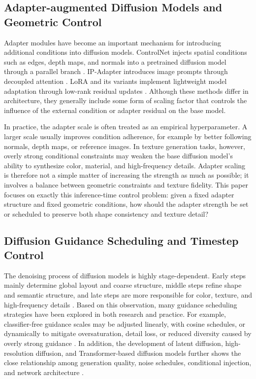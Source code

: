 \documentclass[times,twocolumn,final]{elsarticle}
\begin{document}
\subsection{Adapter-augmented Diffusion Models and Geometric Control}
\label{subsec:adapter}

Adapter modules have become an important mechanism for introducing additional conditions into diffusion models. ControlNet injects spatial conditions such as edges, depth maps, and normals into a pretrained diffusion model through a parallel branch \cite{zhang2023controlnet}. IP-Adapter introduces image prompts through decoupled attention \cite{ye2023ipadapter}. LoRA and its variants implement lightweight model adaptation through low-rank residual updates \cite{hu2022lora,liu2024dora,zhang2023adalora}. Although these methods differ in architecture, they generally include some form of scaling factor that controls the influence of the external condition or adapter residual on the base model.

In practice, the adapter scale is often treated as an empirical hyperparameter. A larger scale usually improves condition adherence, for example by better following normals, depth maps, or reference images. In texture generation tasks, however, overly strong conditional constraints may weaken the base diffusion model's ability to synthesize color, material, and high-frequency details. Adapter scaling is therefore not a simple matter of increasing the strength as much as possible; it involves a balance between geometric constraints and texture fidelity. This paper focuses on exactly this inference-time control problem: given a fixed adapter structure and fixed geometric conditions, how should the adapter strength be set or scheduled to preserve both shape consistency and texture detail?

\subsection{Diffusion Guidance Scheduling and Timestep Control}
\label{subsec:guidance}

The denoising process of diffusion models is highly stage-dependent. Early steps mainly determine global layout and coarse structure, middle steps refine shape and semantic structure, and late steps are more responsible for color, texture, and high-frequency details \cite{ho2020ddpm,song2021ddim}. Based on this observation, many guidance scheduling strategies have been explored in both research and practice. For example, classifier-free guidance scales may be adjusted linearly, with cosine schedules, or dynamically to mitigate oversaturation, detail loss, or reduced diversity caused by overly strong guidance \cite{ho2022cfg,castillo2023adaptive}. In addition, the development of latent diffusion, high-resolution diffusion, and Transformer-based diffusion models further shows the close relationship among generation quality, noise schedules, conditional injection, and network architecture \cite{rombach2022ldm,esser2024scaling,blackforestlabs2024flux,loshchilov2019decoupled,cherti2023reproducible,nichol2022glide,saharia2022photorealistic,peebles2023scalable}.
\end{document}

